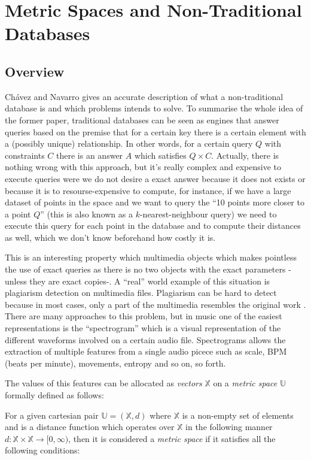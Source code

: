 \section{Metric Spaces and Non-Traditional Databases}
\subsection{Overview}
Chávez and Navarro \cite{chavez2005metric} gives an accurate description of what a non-traditional database
is and which problems intends to solve. To summarise the whole idea of the former paper, traditional databases
can be seen as engines that answer queries based on the premise that for a certain key there is a certain element
with a (possibly unique) relationship. In other words, for a certain query $Q$ with constraints $C$ there is an answer
$A$ which satisfies $Q \times C$. Actually, there is nothing wrong with this approach, but it's really complex and
expensive to execute queries were we do not desire a exact answer because it does not exists or because it is
to resourse-expensive to compute, for instance, if we have a large dataset of points in the space and we want to query 
the ``10 points more closer to a point $Q$'' (this is also known as a $k$-nearest-neighbour query) we need to 
execute this query for each point in the database and to compute their distances as well, which we don't know beforehand
how costly it is.

This is an interesting property which multimedia objects which makes pointless the use of exact queries as there is
no two objects with the exact parameters -unless they are exact copies-. A ``real'' world example of this situation is plagiarism
detection on multimedia files. Plagiarism\cite{dictionary_plagiarism}
can be hard to detect because in most cases, only a part of the multimedia resembles the original work \cite{citation_needed}.
There are many approaches to this problem, but in music one of the easiest representations is the ``spectrogram''\cite{citation_needed}
which is a visual representation of the different waveforms involved on a certain audio file. Spectrograms allows the extraction of
multiple features from a single audio picece such as scale, BPM (beats per minute), movements, entropy and so on, so forth.


The values of this features can be allocated as \emph{vectors} $\mathbb{X}$ on a \emph{metric space} $\mathbb{U}$ formally defined as follows:

For a given cartesian pair $\mathbb{U} = (\mathbb{X}, d)$ where $\mathbb{X}$ is a non-empty set of elements and is a distance function which
operates over $\mathbb{X}$ in the following manner $d: \mathbb{X}\times\mathbb{X}\rightarrow[0,\infty)$, then it is considered a \emph{metric space}
if it satisfies all the following conditions:

